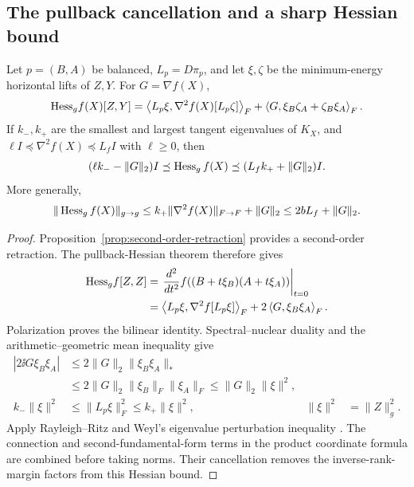 \subsection{The pullback cancellation and a sharp Hessian bound}
\label{app:sharp-pullback}
\begin{theorem}
\label{thm:sharp-pullback}
Let $p=(B,A)$ be balanced, $L_p=D\pi_p$, and let $\xi,\zeta$
be the minimum-energy horizontal lifts of $Z,Y$.
For $G=\nabla f(X)$,
\begin{equation}
{\rm Hess}_g f(X)[Z,Y]
=\left\langle L_p\xi,\nabla^2f(X)[L_p\zeta]\right\rangle_F
+\left\langle G,\xi_B\zeta_A+\zeta_B\xi_A\right\rangle_F.
\label{eq:sharp-pullback}
\end{equation}
If $k_-,k_+$ are the smallest and largest tangent eigenvalues of
$K_X$, and
$\ell I\preceq\nabla^2f(X)\preceq L_fI$ with $\ell\geq0$, then
\begin{equation}
(\ell k_- -\|G\|_2)I
\preceq\operatorname{Hess}_g f(X)
\preceq(L_fk_+ +\|G\|_2)I .
\label{eq:sharp-Hessian-sector}
\end{equation}
More generally,
\begin{equation}
\|\operatorname{Hess}_g f(X)\|_{g\to g}
\leq k_+\|\nabla^2 f(X)\|_{F\to F}+\|G\|_2
\leq2bL_f+\|G\|_2 .
\label{eq:sharp-Hessian-bound}
\end{equation}
\end{theorem}
\begin{proof}
Proposition~\ref{prop:second-order-retraction} provides a second-order
retraction. The pullback-Hessian theorem
\citep[Propositions 5.44--5.45]{boumal2023introduction} therefore gives
\begin{align}
{\rm Hess}_g f[Z,Z]
&=\left.\frac{d^2}{dt^2}
f((B+t\xi_B)(A+t\xi_A))\right|_{t=0}\\
&=\left\langle L_p\xi,\nabla^2f[L_p\xi]\right\rangle_F
+2\left\langle G,\xi_B\xi_A\right\rangle_F.
\end{align}
Polarization proves the bilinear identity. Spectral--nuclear
duality and the arithmetic--geometric mean inequality give
\begin{align}
|2\ii G{\xi_B\xi_A}|
&\leq2\|G\|_2\|\xi_B\xi_A\|_*\\
&\leq2\|G\|_2\|\xi_B\|_F\|\xi_A\|_F
\leq\|G\|_2\|\xi\|^2,\\
k_-\|\xi\|^2
&\leq\|L_p\xi\|_F^2\leq k_+\|\xi\|^2,&
\|\xi\|^2&=\|Z\|_g^2 .
\end{align}
Apply Rayleigh--Ritz and Weyl's eigenvalue perturbation inequality
\citep[Chapter III]{bhatia1997matrix}.
The connection and second-fundamental-form terms in the product
coordinate formula are combined before taking norms. Their
cancellation removes the inverse-rank-margin factors from this
Hessian bound.
\end{proof}

